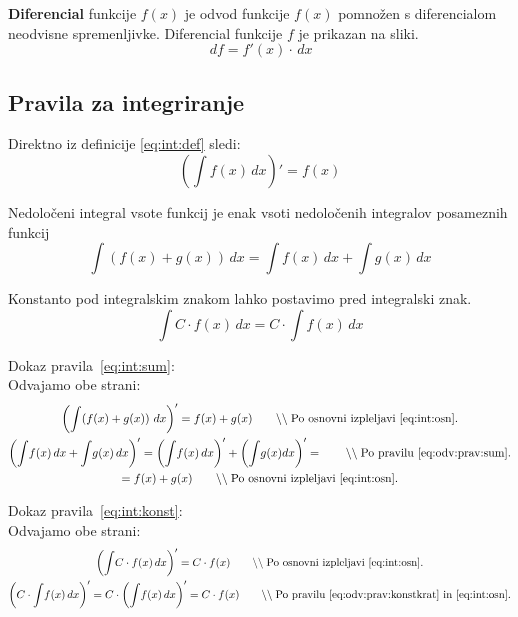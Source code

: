 \documentclass[a4paper,oneside,12pt,fleqn]{article}
\newcommand\krat\cdot
\newcommand{\comment}[1]{\ensuremath{\qquad\backslash\backslash\;}\textnormal{#1}}
\renewcommand{\d}{\ensuremath{\,d}} %
\newcommand{\dx}{\ensuremath{\d x}}
\newcommand{\df}{\ensuremath{\d f}}
\numberwithin{equation}{section}
\begin{document}
\textbf{Diferencial} funkcije $f(x)$ je odvod funkcije $f(x)$ pomnožen s diferencialom neodvisne
spremenljivke. Diferencial funkcije $f$ je prikazan na sliki.
\begin{equation}
  \df = f'(x) \krat \dx \label{eq:int:dif}
\end{equation}

\subsection{Pravila za integriranje}
\label{sec:int:prav}
Direktno iz definicije \eqref{eq:int:def} sledi:
\begin{equation}
  \left( \int\!f(x)\dx \right)' = f(x) \label{eq:int:osn}
\end{equation}

Nedoločeni integral vsote funkcij je enak vsoti nedoločenih integralov posameznih funkcij
\begin{equation}
  \int\!\left( f(x) + g(x) \right)\dx = \int\!f(x)\dx + \int\!g(x)\dx \label{eq:int:sum}
\end{equation}

Konstanto pod integralskim znakom lahko postavimo pred integralski znak.
\begin{equation}
  \int\!C\krat f(x)\dx = C\krat \int\!f(x)\dx \label{eq:int:konst}
\end{equation}

Dokaz pravila~\eqref{eq:int:sum}: \\
Odvajamo obe strani:
\begin{gather*}
  \left( \int\!\left( f(x) + g(x) \right)\dx\right)' = f(x) + g(x) \comment{Po osnovni izpleljavi~\eqref{eq:int:osn}.} \\
  \left( \int\!f(x)\dx + \int\!g(x)\dx \right)' = \left( \int\!f(x)\dx \right)' + \left( \int\!g(x)dx \right)' = \comment{Po pravilu~\eqref{eq:odv:prav:sum}.} \\ 
  = f(x) + g(x) \comment{Po osnovni izpleljavi~\eqref{eq:int:osn}.} 
\end{gather*}

Dokaz pravila~\eqref{eq:int:konst}: \\
Odvajamo obe strani:
\begin{gather*}
  \left( \int\!C\krat f(x)\dx \right)' = C\krat f(x) \comment{Po osnovni izpleljavi~\eqref{eq:int:osn}.} \\
  \left( C\krat \int\!f(x)\dx \right)' = C\krat \left( \int\!f(x)\dx \right)' = C \krat f(x) \comment{Po pravilu~\eqref{eq:odv:prav:konstkrat} in~\eqref{eq:int:osn}.}
\end{gather*}
\end{document}
